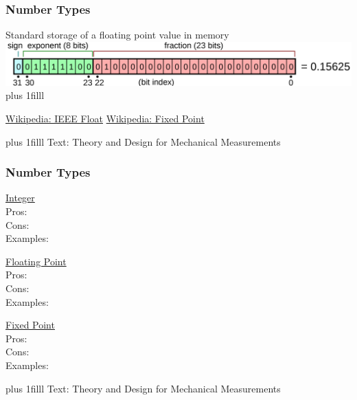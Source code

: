 \documentclass[fleqn]{beamer} %
\newcommand{\sectionIsubsectionIItitle}{Number Types}
\newcommand{\btVFill}{\vskip0pt plus 1filll}
\begin{document}
			\begin{frame}

				\frametitle{\sectionIsubsectionIItitle} \small
				\bigskip




			  	Standard storage of a floating point value in memory\\	

			  	\includegraphics[scale=.10]{images/ieee754_bits.png}	
			  	\btVFill
				
				{\tiny \href{https://en.wikipedia.org/wiki/IEEE_754}{Wikipedia: IEEE Float} \href{https://en.wikipedia.org/wiki/Fixed-point_arithmetic}{Wikipedia: Fixed Point} }

			\end{frame}

			\begin{frame}
			\bigskip 


			
			\btVFill
			\tiny{Text: Theory and Design for Mechanical Measurements}	
			\end{frame}

			\begin{frame}

				\frametitle{\sectionIsubsectionIItitle} \small
				\bigskip

				\begin{multicols}{3}
					\underline{Integer} \vspace{10mm}\\
					Pros:\vspace{10mm}\\
					Cons:\vspace{10mm}\\
					Examples:

					\underline{Floating Point} \vspace{10mm}\\	
					Pros:\vspace{10mm}\\
					Cons:\vspace{10mm}\\
					Examples:

					\underline{Fixed Point} \vspace{10mm}\\	
					Pros:\vspace{10mm}\\
					Cons:\vspace{10mm}\\
					Examples:
				\end{multicols}
				
				\btVFill
				\tiny{Text: Theory and Design for Mechanical Measurements}	
			\end{frame}
\end{document}

